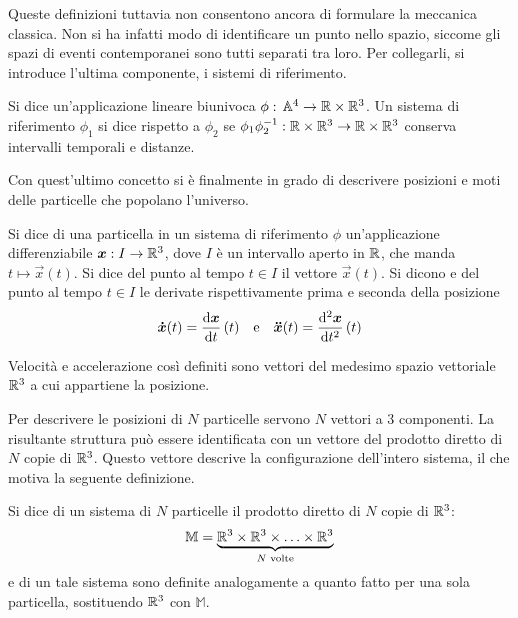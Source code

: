 Queste definizioni tuttavia non consentono ancora di formulare la meccanica classica. Non si ha infatti modo di identificare un punto nello spazio, siccome gli spazi di eventi contemporanei sono tutti separati tra loro. Per collegarli, si introduce l'ultima componente, i sistemi di riferimento.
\begin{definition}
  Si dice  un'applicazione lineare biunivoca $\phi:\, \mathbb{A}^4 \to \mathbb{R}\times \mathbb{R}^3$. Un sistema di riferimento $\phi_1$ si dice  rispetto a $\phi_2$ se $\phi_1 \phi_2^{-1}: \mathbb{R}\times \mathbb{R}^3\to \mathbb{R}\times \mathbb{R}^3$ conserva intervalli temporali e distanze.
\end{definition}

Con quest'ultimo concetto si è finalmente in grado di descrivere posizioni e moti delle particelle che popolano l'universo.
\begin{definition}
  Si dice  di una particella in un sistema di riferimento $\phi$ un'applicazione differenziabile $\boldsymbol{x}:I \to \mathbb{R}^3$, dove $I$ è un intervallo aperto in $\mathbb{R}$, che manda $t\mapsto \vec{x}(t)$. Si dice  del punto al tempo $t \in I$ il vettore $\vec{x}(t)$. Si dicono  e  del punto al tempo $t \in I$ le derivate rispettivamente prima e seconda della posizione \begin{equation*}
  \vec{\dot{x}} (t) = \dv{\vec{x}}{t}\, (t) \qqtext{e} \vec{\ddot{x}} (t) = \dv[2]{\vec{x}}{t}\, (t)
  \end{equation*} 
\end{definition}
\begin{remark}
  Velocità e accelerazione così definiti sono vettori del medesimo spazio vettoriale $\mathbb{R}^3$ a cui appartiene la posizione.
\end{remark}

Per descrivere le posizioni di $N$ particelle servono $N$ vettori a 3 componenti. La risultante struttura può essere identificata con un vettore del prodotto diretto di $N$ copie di $\mathbb{R}^3$. Questo vettore descrive la configurazione dell'intero sistema, il che motiva la seguente definizione.
\begin{definition}
  Si dice  di un sistema di $N$ particelle il prodotto diretto di $N$ copie di $\mathbb{R}^3$: \begin{equation*}
  \mathbb{M} = \underbrace{\mathbb{R}^3 \times \mathbb{R}^3 \times \ldots \times \mathbb{R}^3}_{N \text{ volte}}
  \end{equation*} 
   e  di un tale sistema sono definite analogamente a quanto fatto per una sola particella, sostituendo $\mathbb{R}^3$ con $\mathbb{M}$.
\end{definition}

